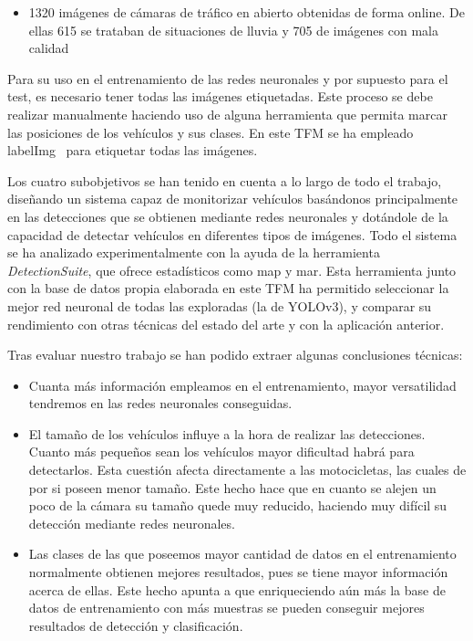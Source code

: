 \begin{itemize}
\begin{itemize}
        \item 1320 imágenes de cámaras de tráfico en abierto obtenidas de forma online. De ellas 615 se trataban de situaciones de lluvia y 705 de imágenes con mala calidad
    \end{itemize} 
    Para su uso en el entrenamiento de las redes neuronales y por supuesto para el test, es necesario tener todas las imágenes etiquetadas. Este proceso se debe realizar manualmente haciendo uso de alguna herramienta que permita marcar las posiciones de los vehículos y sus clases. En este TFM se ha empleado labelImg~\cite{labelimg} para etiquetar todas las imágenes.
\end{itemize}

Los cuatro subobjetivos se han tenido en cuenta a lo largo de todo el trabajo, diseñando un sistema capaz de monitorizar vehículos basándonos principalmente en las detecciones que se obtienen mediante redes neuronales y dotándole de la capacidad de detectar vehículos en diferentes tipos de imágenes.
Todo el sistema se ha analizado experimentalmente con la ayuda de la herramienta \textit{DetectionSuite}, que ofrece estadísticos como \acrshort{map} y \acrshort{mar}. Esta herramienta junto con la base de datos propia elaborada en este TFM ha permitido seleccionar la mejor red neuronal de todas las exploradas (la de YOLOv3), y comparar su rendimiento con otras técnicas del estado del arte y con la aplicación anterior.

Tras evaluar nuestro trabajo se han podido extraer algunas conclusiones técnicas:
\begin{itemize}
    \item Cuanta más información empleamos en el entrenamiento, mayor versatilidad tendremos en las redes neuronales conseguidas.
    \item El tamaño de los vehículos influye a la hora de realizar las detecciones. Cuanto más pequeños sean los vehículos mayor dificultad habrá para detectarlos. Esta cuestión afecta directamente a las motocicletas, las cuales de por si poseen menor tamaño. Este hecho hace que en cuanto se alejen un poco de la cámara su tamaño quede muy reducido, haciendo muy difícil su detección mediante redes neuronales.
    \item Las clases de las que poseemos mayor cantidad de datos en el entrenamiento normalmente obtienen mejores resultados, pues se tiene mayor información acerca de ellas. Este hecho apunta a que enriqueciendo aún más la base de datos de entrenamiento con más muestras se pueden conseguir mejores resultados de detección y clasificación.
\end{itemize}


